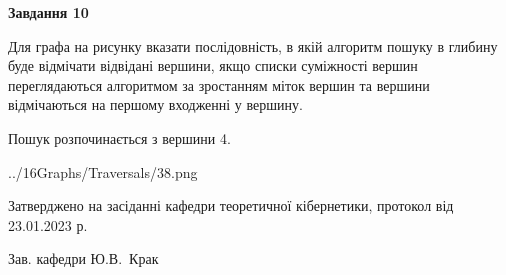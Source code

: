 \documentclass[12pt, ukrainian]{article}
\begin{document}
{\begin {large}
{\begin {center}\textbf{Завдання 10}\end {center}}\par
Для графа на рисунку вказати послідовність, в якій алгоритм пошуку в глибину буде відмічати відвідані вершини, якщо списки суміжності вершин переглядаються алгоритмом за зростанням міток вершин та вершини відмічаються на першому вход\-женні у вершину.\par
Пошук розпочинається з вершини 4.\par

\begin{center}
	{../16Graphs/Traversals/38.png}
\end{center}\par
\newpage


\end {large}
}
{\smallskip \begin {small} Затверджено на засіданні кафедри теоретичної кібернетики, протокол  від   23.01.2023 р.\par\smallskip\smallskip
{\parbox {6.5 cm}{Зав. кафедри \dotfill Ю.В.~Крак}} \end{small}}
\end{document}
